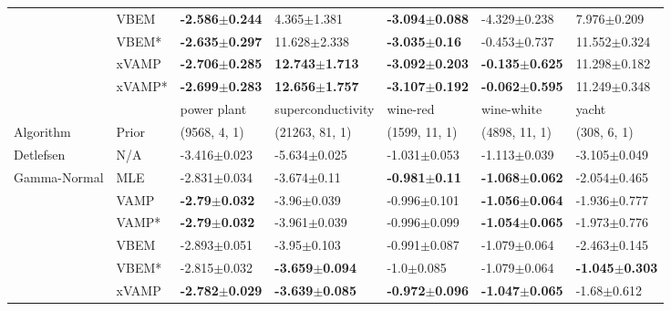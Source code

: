 \begin{tabular}{lllllll}
                 & VBEM &  \textbf{-2.586$\pm$0.244} &            4.365$\pm$1.381 &  \textbf{-3.094$\pm$0.088} &           -4.329$\pm$0.238 &            7.976$\pm$0.209 \\
                 & VBEM* &  \textbf{-2.635$\pm$0.297} &           11.628$\pm$2.338 &   \textbf{-3.035$\pm$0.16} &           -0.453$\pm$0.737 &           11.552$\pm$0.324 \\
                 & xVAMP &  \textbf{-2.706$\pm$0.285} &  \textbf{12.743$\pm$1.713} &  \textbf{-3.092$\pm$0.203} &  \textbf{-0.135$\pm$0.625} &           11.298$\pm$0.182 \\
                 & xVAMP* &  \textbf{-2.699$\pm$0.283} &  \textbf{12.656$\pm$1.757} &  \textbf{-3.107$\pm$0.192} &  \textbf{-0.062$\pm$0.595} &           11.249$\pm$0.348 \\
\midrule
                 &        &                power plant &          superconductivity &                   wine-red &                 wine-white &                      yacht \\
Algorithm & Prior& (9568, 4, 1)& (21263, 81, 1)& (1599, 11, 1)& (4898, 11, 1)& (308, 6, 1)\\
\midrule
Detlefsen & N/A &           -3.416$\pm$0.023 &           -5.634$\pm$0.025 &           -1.031$\pm$0.053 &           -1.113$\pm$0.039 &           -3.105$\pm$0.049 \\
Gamma-Normal & MLE &           -2.831$\pm$0.034 &            -3.674$\pm$0.11 &   \textbf{-0.981$\pm$0.11} &  \textbf{-1.068$\pm$0.062} &           -2.054$\pm$0.465 \\
                 & VAMP &   \textbf{-2.79$\pm$0.032} &            -3.96$\pm$0.039 &           -0.996$\pm$0.101 &  \textbf{-1.056$\pm$0.064} &           -1.936$\pm$0.777 \\
                 & VAMP* &   \textbf{-2.79$\pm$0.032} &           -3.961$\pm$0.039 &           -0.996$\pm$0.099 &  \textbf{-1.054$\pm$0.065} &           -1.973$\pm$0.776 \\
                 & VBEM &           -2.893$\pm$0.051 &            -3.95$\pm$0.103 &           -0.991$\pm$0.087 &           -1.079$\pm$0.064 &           -2.463$\pm$0.145 \\
                 & VBEM* &           -2.815$\pm$0.032 &  \textbf{-3.659$\pm$0.094} &             -1.0$\pm$0.085 &           -1.079$\pm$0.064 &  \textbf{-1.045$\pm$0.303} \\
                 & xVAMP &  \textbf{-2.782$\pm$0.029} &  \textbf{-3.639$\pm$0.085} &  \textbf{-0.972$\pm$0.096} &  \textbf{-1.047$\pm$0.065} &            -1.68$\pm$0.612 \\

\end{tabular}
